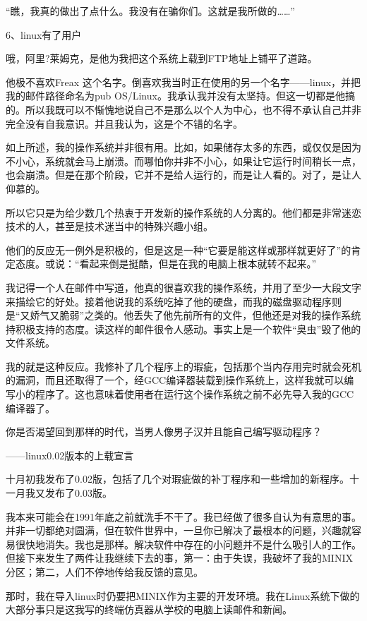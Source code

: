 “瞧，我真的做出了点什么。我没有在骗你们。这就是我所做的……”

 
6、linux有了用户

哦，阿里?莱姆克，是他为我把这个系统上载到FTP地址上铺平了道路。

他极不喜欢Freax 这个名字。倒喜欢我当时正在使用的另一个名字——linux，并把我的邮件路径命名为pub OS/Linux。我承认我并没有太坚持。但这一切都是他搞的。所以我既可以不惭愧地说自己不是那么以个人为中心，也不得不承认自己并非完全没有自我意识。并且我认为，这是个不错的名字。

如上所述，我的操作系统并非很有用。比如，如果储存太多的东西，或仅仅是因为不小心，系统就会马上崩溃。而哪怕你并非不小心，如果让它运行时间稍长一点，也会崩溃。但是在那个阶段，它并不是给人运行的，而是让人看的。对了，是让人仰慕的。

所以它只是为给少数几个热衷于开发新的操作系统的人分离的。他们都是非常迷恋技术的人，甚至是技术迷当中的特殊兴趣小组。

他们的反应无一例外是积极的，但是这是一种“它要是能这样或那样就更好了”的肯定态度。或说：“看起来倒是挺酷，但是在我的电脑上根本就转不起来。”

我记得一个人在邮件中写道，他真的很喜欢我的操作系统，并用了至少一大段文字来描绘它的好处。接着他说我的系统吃掉了他的硬盘，而我的磁盘驱动程序则是“又娇气又脆弱”之类的。他丢失了他先前所有的文件，但他还是对我的操作系统持积极支持的态度。读这样的邮件很令人感动。事实上是一个软件“臭虫”毁了他的文件系统。

我的就是这种反应。我修补了几个程序上的瑕疵，包括那个当内存用完时就会死机的漏洞，而且还取得了一个，经GCC编译器装载到操作系统上，这样我就可以编写小的程序了。这也意味着使用者在运行这个操作系统之前不必先导入我的GCC编译器了。

 

你是否渴望回到那样的时代，当男人像男子汉并且能自己编写驱动程序？

——linux0.02版本的上载宣言

 

十月初我发布了0.02版，包括了几个对瑕疵做的补丁程序和一些增加的新程序。十一月我又发布了0.03版。

我本来可能会在1991年底之前就洗手不干了。我已经做了很多自认为有意思的事。并非一切都绝对圆满，但在软件世界中，一旦你已解决了最根本的问题，兴趣就容易很快地消失。我也是那样。解决软件中存在的小问题并不是什么吸引人的工作。但接下来发生了两件让我继续下去的事，第一：由于失误，我破坏了我的MINIX分区；第二，人们不停地传给我反馈的意见。

那时，我在导入linux时仍要把MINIX作为主要的开发环境。我在Linux系统下做的大部分事只是这我写的终端仿真器从学校的电脑上读邮件和新闻。

